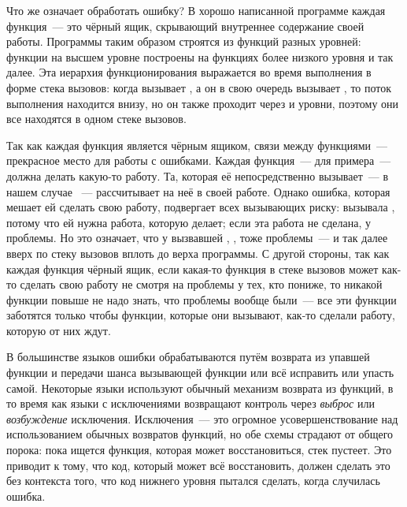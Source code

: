Что же означает обработать ошибку? В хорошо написанной программе каждая функция~--- это
чёрный ящик, скрывающий внутреннее содержание своей работы. Программы таким образом
строятся из функций разных уровней: функции на высшем уровне построены на функциях более
низкого уровня и так далее. Эта иерархия функционирования выражается во время выполнения в
форме стека вызовов: когда  вызывает , а он в свою очередь
вызывает , то поток выполнения находится внизу, но он также проходит через
 и  уровни, поэтому они все находятся в одном стеке вызовов.

Так как каждая функция является чёрным ящиком, связи между функциями~--- прекрасное место
для работы с ошибками. Каждая функция~---  для примера~--- должна делать
какую-то работу. Та, которая её непосредственно вызывает~---  в нашем случае
~--- рассчитывает на неё в своей работе. Однако ошибка, которая мешает ей сделать свою
работу, подвергает всех вызывающих риску:  вызывала , потому
что ей нужна работа, которую  делает; если эта работа не сделана, у
 проблемы. Но это означает, что у вызвавшей , ,
тоже проблемы~--- и так далее вверх по стеку вызовов вплоть до верха программы. С другой
стороны, так как каждая функция чёрный ящик, если какая-то функция в стеке вызовов может
как-то сделать свою работу не смотря на проблемы у тех, кто пониже, то никакой функции
повыше не надо знать, что проблемы вообще были~--- все эти функции заботятся только чтобы
функции, которые они вызывают, как-то сделали работу, которую от них ждут.

В большинстве языков ошибки обрабатываются путём возврата из упавшей функции и передачи
шанса вызывающей функции или всё исправить или упасть самой. Некоторые языки используют
обычный механизм возврата из функций, в то время как языки с исключениями возвращают
контроль через \textit{выброс} или \textit{возбуждение} исключения. Исключения~--- это
огромное усовершенствование над использованием обычных возвратов функций, но обе схемы
страдают от общего порока: пока ищется функция, которая может восстановиться, стек
пустеет. Это приводит к тому, что код, который может всё восстановить, должен сделать это
без контекста того, что код нижнего уровня пытался сделать, когда случилась ошибка.

